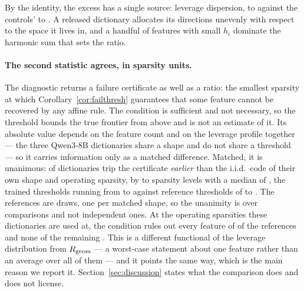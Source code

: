 By the identity, the excess has a single source: leverage dispersion, \SaeDictCvMin{} to
\SaeDictCvMax{} against the controls' \SaeCtlCvMin{} to \SaeCtlCvMax{}. A released dictionary
allocates its directions unevenly with respect to the space it lives in, and a handful of features
with small $h_i$ dominate the harmonic sum that sets the ratio.

\paragraph{The second statistic agrees, in sparsity units.} The diagnostic returns a failure
certificate as well as a ratio: the smallest sparsity at which Corollary~\ref{cor:failthresh}
guarantees that some feature cannot be recovered by any affine rule. The condition is sufficient and
not necessary, so the threshold bounds the true frontier from above and is not an estimate of it.
Its absolute value depends on the feature count and on the leverage profile together --- the three
Qwen3-8B dictionaries share a shape and do not share a threshold --- so it carries information only
as a matched difference. Matched, it is unanimous: \SaeFailEarlier{} of
\SaeDicts{} dictionaries trip the certificate \emph{earlier} than the i.i.d.\ code of their own shape
and operating sparsity, by \SaeFailGapMin{} to \SaeFailGapMax{} sparsity levels with a median of
\SaeFailGapMedian{}, the trained thresholds running from \SaeFailTrainedMin{} to
\SaeFailTrainedMax{} against reference thresholds of \SaeFailCtlMin{} to \SaeFailCtlMax{}. The
references are \SaeFailRefs{} draws, one per matched shape, so the unanimity is over \SaeDicts{}
comparisons and not \SaeDicts{} independent ones. At the operating sparsities these dictionaries are
used at, the condition rules out every feature of \SaeFailCtlAllRuledOut{} of the \SaeFailRefs{}
references and none of the remaining \SaeFailCtlNoneRuledOut{}. This is a different functional of the
leverage distribution from $R_{\mathrm{geom}}$ --- a worst-case statement about one feature rather than an
average over all of them --- and it points the same way, which is the main reason we report it.
Section~\ref{sec:discussion} states what the comparison does and does not license.

